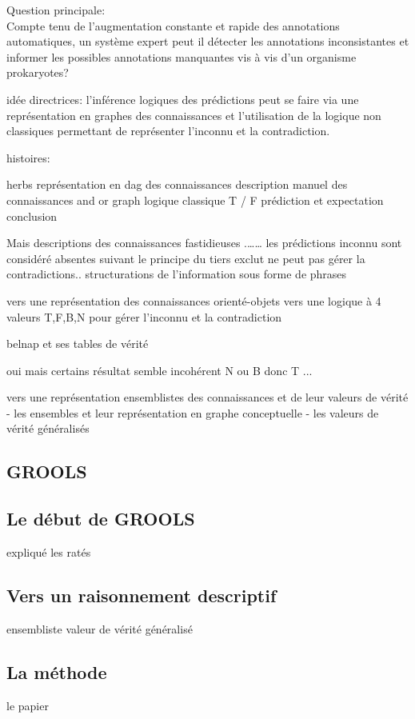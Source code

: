 Question principale:\\
Compte tenu de l'augmentation constante et rapide des annotations automatiques, un système expert peut il détecter les annotations inconsistantes et informer les possibles annotations manquantes vis à vis d'un organisme prokaryotes? 

idée directrices:
l'inférence logiques des prédictions peut se faire via une représentation en graphes des connaissances et l'utilisation de la logique non classiques permettant de représenter l'inconnu et la contradiction.

histoires:

herbs
   représentation en dag des connaissances
   description manuel des connaissances
   and or graph 
   logique classique T / F
   prédiction et expectation
   conclusion
   
Mais descriptions des connaissances fastidieuses .…… 
les prédictions inconnu sont considéré absentes suivant le principe du tiers exclut
ne peut pas gérer la contradictions..
structurations de l'information sous forme de phrases

vers une représentation des connaissances orienté-objets
vers une logique à 4 valeurs T,F,B,N pour gérer l'inconnu et la contradiction

belnap et ses tables de vérité

oui mais certains résultat semble incohérent  N ou B donc T ...

vers une représentation ensemblistes des connaissances et de leur valeurs de vérité
  - les ensembles et leur représentation en graphe conceptuelle
  - les valeurs de vérité généralisés

\begin{refsection}
\chapter{GROOLS}
\section{Le début de GROOLS}
expliqué les ratés
\section{Vers un raisonnement descriptif}
ensembliste valeur de vérité généralisé
\section{La méthode}
le papier
\subbibliography
\end{refsection}